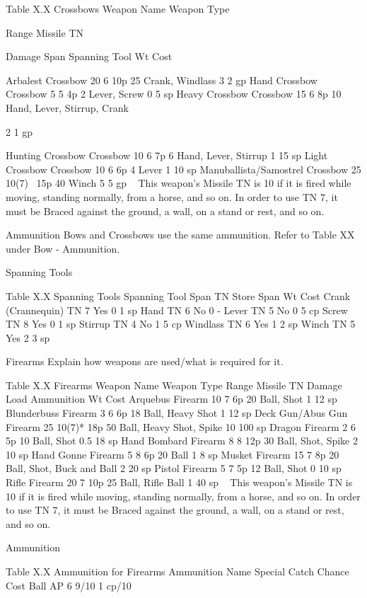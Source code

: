 \documentclass[oneside,11pt,english]{book}
\begin{document}
 
Table X.X Crossbows 
Weapon Name Weapon 
Type 

Range Missile 
TN 

Damage Span Spanning Tool Wt Cost 

Arbalest Crossbow 20 6 10p 25 Crank, Windlass 3 2 gp 
Hand Crossbow Crossbow 5 5 4p 2 Lever, Screw 0 5 sp 
Heavy Crossbow Crossbow 15 6 8p 10 Hand, Lever, Stirrup, 
Crank 

2 1 gp 

Hunting Crossbow Crossbow 10 6 7p 6 Hand, Lever, Stirrup 1 15 
sp 
Light Crossbow Crossbow 10 6 6p 4 Lever 1 10 
sp 
Manuballista/Samostrel Crossbow 25 10(7)~ 15p 40 Winch 5 5 gp 
~ This weapon’s Missile TN is 10 if it is fired while moving, standing normally, from a horse, and so on. In order to use TN 7, it 
must be Braced against the ground, a wall, on a stand or rest, and so on. 

 

Ammunition 
Bows and Crossbows use the same ammunition. Refer to Table XX under Bow - Ammunition. 

 


Spanning Tools 

 
Table X.X Spanning Tools 
Spanning Tool Span TN Store Span Wt Cost 
Crank (Crannequin) TN 7 Yes 0 1 sp 
Hand TN 6 No 0 - 
Lever TN 5 No 0 5 cp 
Screw TN 8 Yes 0 1 sp 
Stirrup TN 4 No 1 5 cp 
Windlass TN 6 Yes 1 2 sp 
Winch TN 5 Yes 2 3 sp 

 

Firearms 
Explain how weapons are used/what is required for it. 

 
Table X.X Firearms 
Weapon Name Weapon Type Range Missile TN Damage Load Ammunition Wt Cost 
Arquebus Firearm 10 7 6p 20 Ball, Shot 1 12 sp 
Blunderbuss Firearm 3 6 6p 18 Ball, Heavy Shot 1 12 sp 
Deck Gun/Abus Gun Firearm 25 10(7)* 18p 50 Ball, Heavy Shot, Spike 10 100 sp 
Dragon Firearm 2 6 5p 10 Ball, Shot 0.5 18 sp 
Hand Bombard Firearm 8 8 12p 30 Ball, Shot, Spike 2 10 sp 
Hand Gonne Firearm 5 8 6p 20 Ball 1 8 sp 
Musket Firearm 15 7 8p 20 Ball, Shot, Buck and Ball 2 20 sp 
Pistol Firearm 5 7 5p 12 Ball, Shot 0 10 sp 
Rifle Firearm 20 7 10p 25 Ball, Rifle Ball 1 40 sp 
~ This weapon’s Missile TN is 10 if it is fired while moving, standing normally, from a horse, and so on. In order to use TN 7, it 
must be Braced against the ground, a wall, on a stand or rest, and so on. 

 

Ammunition 

 
Table X.X Ammunition for Firearms 
Ammunition Name Special Catch Chance Cost 
Ball AP 6 9/10 1 cp/10 
\end{document}
